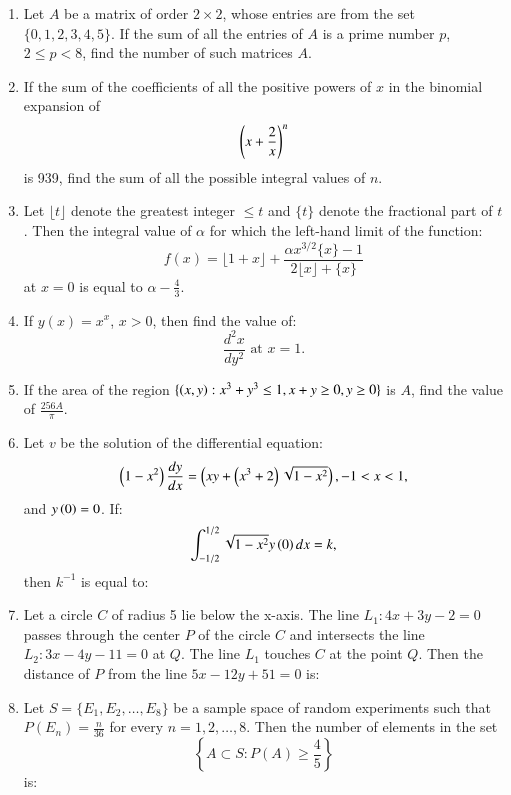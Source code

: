 \documentclass[journal,12pt,twocolumn]{IEEEtran}
\theoremstyle{remark}
\begin{document}
\begin{enumerate}
    \item Let $ A $ be a matrix of order $ 2 \times 2 $, whose entries are from the set $ \{0, 1, 2, 3, 4, 5\} $. If the sum of all the entries of $ A $ is a prime number $ p $, $ 2 \leq p < 8 $, find the number of such matrices $ A $.

    \item If the sum of the coefficients of all the positive powers of $ x $ in the binomial expansion of 
    \[
    \left(x + \frac{2}{x}\right)^n
    \]
    is 939, find the sum of all the possible integral values of $ n $.


    \item Let $ \lfloor t \rfloor $ denote the greatest integer $ \leq t $ and $ \{ t \} $ denote the fractional part of $ t $. Then the integral value of $ \alpha $ for which the left-hand limit of the function:
    \[
    f(x) = \lfloor 1 + x \rfloor + \frac{\alpha x^{3/2} \{ x \} - 1}{2 \lfloor x \rfloor + \{ x \}}
    \]
    at $ x = 0 $ is equal to $ \alpha - \frac{4}{3} $.

    \item If $ y(x) = x^x $, $ x > 0 $, then find the value of:
    \[
    \frac{d^2x}{dy^2} \text{ at } x = 1.
    \]

    \item If the area of the region $ \{ \left(x, y\right): x^3 + y^3 \leq 1, x + y \geq 0, y \geq 0 \} $ is $ A $, find the value of $ \frac{256A}{\pi} $.

    \item Let $ v $ be the solution of the differential equation:
    \[
    \left(1 - x^2\right) \frac{dy}{dx} = \left(xy + \left(x^3 + 2\right)\sqrt{1 - x^2}\right), -1 < x < 1,
    \]
    and $ y\left(0\right) = 0 $. If:
    \[
    \int_{-1/2}^{1/2} \sqrt{1 - x^2} y\left(0\right) dx = k,
    \]
    then $ k^{-1} $ is equal to:

    \item Let a circle $ C $ of radius 5 lie below the x-axis. The line $ L_1: 4x + 3y - 2 = 0 $ passes through the center $ P $ of the circle $ C $ and intersects the line $ L_2: 3x - 4y - 11 = 0 $ at $ Q $. The line $ L_1 $ touches $ C $ at the point $ Q $. Then the distance of $ P $ from the line $ 5x - 12y + 51 = 0 $ is:
    
    \item Let $ S = \{ E_1, E_2, \dots, E_8 \} $ be a sample space of random experiments such that $ P(E_n) = \frac{n}{36} $ for every $ n = 1, 2, \dots, 8 $. Then the number of elements in the set 
    \[
    \left\{ A \subset S : P(A) \geq \frac{4}{5} \right\}
    \]
    is:
   

    
\end{enumerate}
\end{document}
